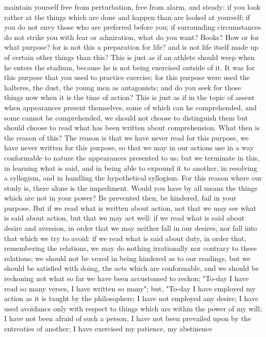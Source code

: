 \documentclass[a4paper]{article}
\begin{document}
maintain yourself free from perturbation, free from alarm, and steady; if you
look rather at the things which are done and happen than are looked at
yourself; if you do not envy those who are preferred before you; if surrounding
circumstances do not strike you with fear or admiration, what do you want?
Books? How or for what purpose? for is not this a preparation for life? and is
not life itself made up of certain other things than this? This is just as if
an athlete should weep when he enters the stadium, because he is not being
exercised outside of it. It was for this purpose that you used to practice
exercise; for this purpose were used the halteres, the dust, the young men as
antagonists; and do you seek for those things now when it is the time of
action? This is just as if in the topic of assent when appearances present
themselves, some of which can he comprehended, and some cannot be comprehended,
we should not choose to distinguish them but should choose to read what has
been written about comprehension.
    What then is the reason of this? The reason is that we have never read for
this purpose, we have never written for this purpose, so that we may in our
actions use in a way conformable to nature the appearances presented to us; but
we terminate in this, in learning what is said, and in being able to expound it
to another, in resolving a syllogism, and in handling the hypothetical
syllogism. For this reason where our study is, there alone is the impediment.
Would you have by all means the things which are not in your power? Be
prevented then, be hindered, fail in your purpose. But if we read what is
written about action, not that we may see what is said about action, but that
we may act well: if we read what is said about desire and aversion, in order
that we may neither fall in our desires, nor fall into that which we try to
avoid: if we read what is said about duty, in order that, remembering the
relations, we may do nothing irrationally nor contrary to these relations; we
should not be vexed in being hindered as to our readings, but we should be
satisfied with doing, the acts which are conformable, and we should be
reckoning not what so far we have been accustomed to reckon; "To-day I have
read so many verses, I have written so many"; but, "To-day I have employed my
action as it is taught by the philosophers; I have not employed any desire; I
have used avoidance only with respect to things which are within the power of
my will; I have not been afraid of such a person, I have not been prevailed
upon by the entreaties of another; I have exercised my patience, my abstinence
\end{document}
